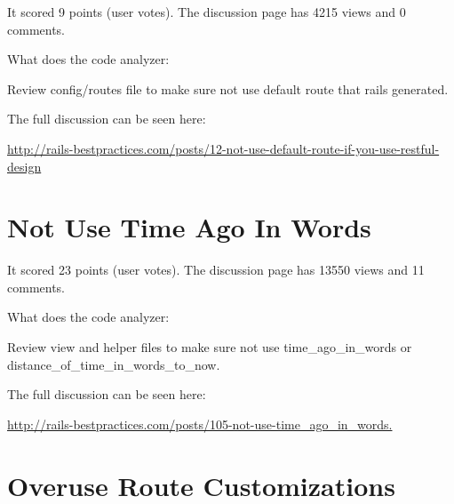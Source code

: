 It scored 9 points (user votes). 
The discussion page has 4215 views and 0 comments.

What does the code analyzer:

Review config/routes file to make sure not use default route that rails generated.
 
The full discussion can be seen here:
  
\url{http://rails-bestpractices.com/posts/12-not-use-default-route-if-you-use-restful-design}

\section{Not Use Time Ago In Words}


It scored 23 points (user votes). 
The discussion page has 13550 views and 11 comments.

What does the code analyzer:

Review view and helper files to make sure not use time\_ago\_in\_words or distance\_of\_time\_in\_words\_to\_now.

The full discussion can be seen here:
 
\url{http://rails-bestpractices.com/posts/105-not-use-time_ago_in_words.}

\section{Overuse Route Customizations}


